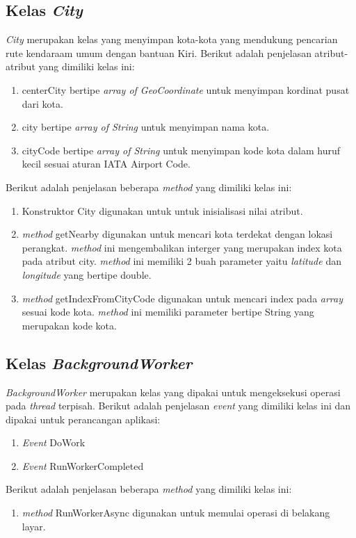 \subsection{Kelas \textit{City}}
\label{lab:Kelas City}
\hspace{0.5cm} \textit{City} merupakan kelas yang menyimpan kota-kota yang mendukung pencarian rute kendaraam umum dengan bantuan Kiri. Berikut adalah penjelasan atribut-atribut yang dimiliki kelas ini:
\begin{enumerate}
	\item centerCity bertipe \textit{array of GeoCoordinate} untuk menyimpan kordinat pusat dari kota.
	\item city bertipe \textit{array of String} untuk menyimpan nama kota.
	\item cityCode bertipe \textit{array of String} untuk menyimpan kode kota dalam huruf kecil sesuai aturan IATA Airport Code. 
\end{enumerate}

Berikut adalah penjelasan beberapa \textit{method} yang dimiliki kelas ini:
\begin{enumerate}
	\item Konstruktor City digunakan untuk untuk inisialisasi nilai atribut.
	\item \textit{method} getNearby digunakan untuk mencari kota terdekat dengan lokasi perangkat. \textit{method} ini mengembalikan interger yang merupakan index kota pada atribut city. \textit{method} ini memiliki 2 buah parameter yaitu \textit{latitude} dan \textit{longitude} yang bertipe double.
	\item \textit{method} getIndexFromCityCode digunakan untuk mencari index pada \textit{array}  sesuai kode kota. \textit{method} ini memiliki parameter bertipe String yang merupakan kode kota.
\end{enumerate}

\subsection{Kelas \textit{BackgroundWorker}}
\label{lab:Kelas BackgroundWorker}
\hspace{0.5cm} \textit{BackgroundWorker} merupakan kelas yang dipakai untuk mengeksekusi operasi pada \textit{thread} terpisah. Berikut adalah penjelasan \textit{event} yang dimiliki kelas ini dan dipakai untuk perancangan aplikasi:
\begin{enumerate}
	\item \textit{Event} DoWork
	\item \textit{Event} RunWorkerCompleted
\end{enumerate}
Berikut adalah penjelasan beberapa \textit{method} yang dimiliki kelas ini:
\begin{enumerate}
	\item \textit{method} RunWorkerAsync digunakan untuk memulai operasi di belakang layar.
\end{enumerate}

